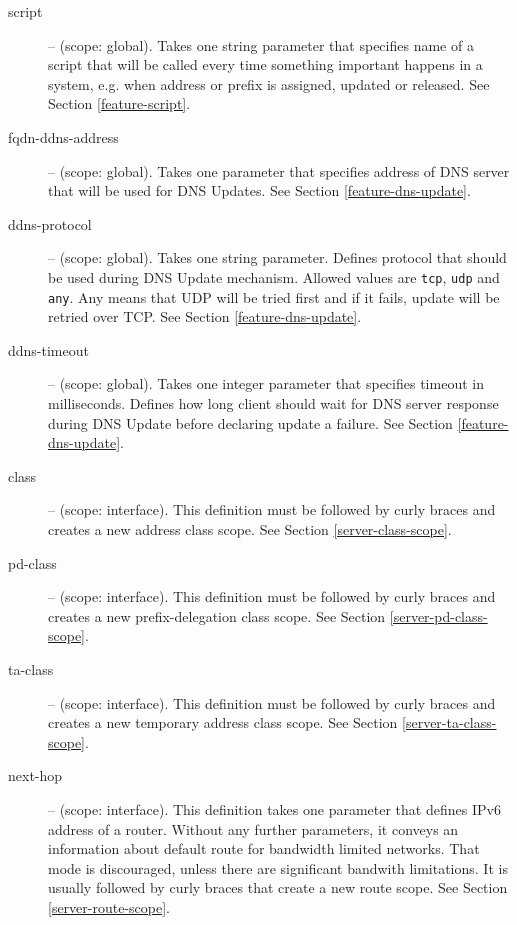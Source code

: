 \begin{description}
\item[script] -- (scope: global). Takes one string parameter that
  specifies name of a script that will be called every time something
  important happens in a system, e.g. when address or prefix is
  assigned, updated or released. See Section \ref{feature-script}.

\item[fqdn-ddns-address] -- (scope: global). Takes one parameter that
  specifies address of DNS server that will be used for DNS
  Updates. See Section \ref{feature-dns-update}.

\item[ddns-protocol] -- (scope: global). Takes one string
parameter. Defines protocol that should be used during DNS Update
mechanism. Allowed values are \verb+tcp+, \verb+udp+ and \verb+any+.
Any means that UDP will be tried first and if it fails, update will be
retried over TCP. See Section \ref{feature-dns-update}.

\item[ddns-timeout] -- (scope: global). Takes one integer parameter
that specifies timeout in milliseconds. Defines how long client should
wait for DNS server response during DNS Update before declaring
update a failure. See Section \ref{feature-dns-update}.

\item[class] -- (scope: interface). This definition must be followed by
curly braces and creates a new address class scope. See
Section \ref{server-class-scope}.

\item[pd-class] -- (scope: interface). This definition must be
followed by curly braces and creates a new prefix-delegation class
scope. See Section \ref{server-pd-class-scope}.

\item[ta-class] -- (scope: interface). This definition must be
followed by curly braces and creates a new temporary address class
scope. See Section \ref{server-ta-class-scope}.

\item[next-hop] -- (scope: interface). This definition takes one
parameter that defines IPv6 address of a router. Without any further
parameters, it conveys an information about default route for
bandwidth limited networks. That mode is discouraged, unless there are
significant bandwith limitations. It is usually followed by curly
braces that create a new route scope. See Section \ref{server-route-scope}.


\end{description}
